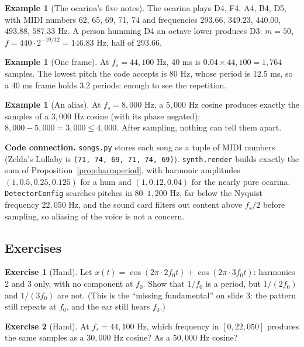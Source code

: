 \documentclass[11pt]{article}
\theoremstyle{definition}
\newtheorem{example}[theorem]{Example}
\newtheorem{innerexercise}{Exercise}[section]
\newenvironment{exercise}[1][]{\begin{innerexercise}[#1]}{\end{innerexercise}}
\newcommand{\code}[1]{\texttt{#1}}
\begin{document}
\begin{example}[The ocarina's five notes]
The ocarina plays D4, F4, A4, B4, D5, with MIDI numbers 62, 65, 69, 71, 74 and
frequencies $293.66$, $349.23$, $440.00$, $493.88$, $587.33$ Hz. A person humming
D4 an octave lower produces D3: $m=50$, $f=440\cdot2^{-19/12}=146.83$ Hz, half of
$293.66$.
\end{example}

\begin{example}[One frame]
At $f_s=44{,}100$ Hz, 40 ms is $0.04\times44{,}100=1{,}764$ samples. The lowest pitch
the code accepts is 80 Hz, whose period is $12.5$ ms, so a 40 ms frame holds $3.2$
periods: enough to see the repetition.
\end{example}

\begin{example}[An alias]
At $f_s=8{,}000$ Hz, a $5{,}000$ Hz cosine produces exactly the samples of a
$3{,}000$ Hz cosine (with its phase negated): $8{,}000-5{,}000=3{,}000\le4{,}000$.
After sampling, nothing can tell them apart.
\end{example}

\begin{connection}
\textbf{Code connection.} \code{songs.py} stores each song as a tuple of MIDI numbers
(Zelda's Lullaby is \code{(71, 74, 69, 71, 74, 69)}). \code{synth.render} builds
exactly the sum of Proposition~\ref{prop:harmperiod}, with harmonic amplitudes
$(1, 0.5, 0.25, 0.125)$ for a hum and $(1, 0.12, 0.04)$ for the nearly pure ocarina.
\code{DetectorConfig} searches pitches in $80$--$1{,}200$ Hz, far below the Nyquist
frequency $22{,}050$ Hz, and the sound card filters out content above $f_s/2$ before
sampling, so aliasing of the voice is not a concern.
\end{connection}

\subsection{Exercises}
\begin{exercise}[Hand]\label{ex:missing}
Let $x(t)=\cos(2\pi\cdot2f_0t)+\cos(2\pi\cdot3f_0t)$: harmonics 2 and 3 only, with no
component at $f_0$. Show that $1/f_0$ is a period, but $1/(2f_0)$ and $1/(3f_0)$ are
not. (This is the ``missing fundamental'' on slide 3: the pattern still repeats at
$f_0$, and the ear still hears $f_0$.)
\end{exercise}

\begin{exercise}[Hand]\label{ex:alias}
At $f_s=44{,}100$ Hz, which frequency in $[0,22{,}050]$ produces the same samples as a
$30{,}000$ Hz cosine? As a $50{,}000$ Hz cosine?
\end{exercise}
\end{document}
